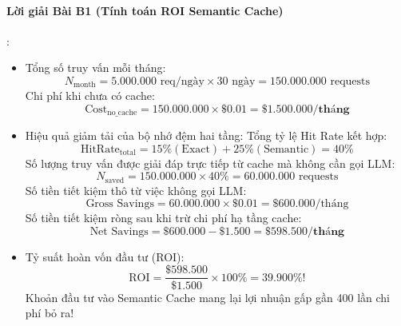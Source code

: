 \paragraph{Lời giải Bài B1 (Tính toán ROI Semantic Cache)}:
\begin{itemize}
  \item[a)] Tổng số truy vấn mỗi tháng:
  \begin{equation*}
  N_{\text{month}} = 5.000.000 \text{ req/ngày} \times 30 \text{ ngày} = 150.000.000 \text{ requests}
  \end{equation*}
  Chi phí khi chưa có cache:
  \begin{equation*}
  \text{Cost}_{\text{no\_cache}} = 150.000.000 \times \$0.01 = \mathbf{\$1.500.000\text{/tháng}}
  \end{equation*}

  \item[b)] Hiệu quả giảm tải của bộ nhớ đệm hai tầng:
  Tổng tỷ lệ Hit Rate kết hợp:
  \begin{equation*}
  \text{HitRate}_{\text{total}} = 15\% (\text{Exact}) + 25\% (\text{Semantic}) = 40\%
  \end{equation*}
  Số lượng truy vấn được giải đáp trực tiếp từ cache mà không cần gọi LLM:
  \begin{equation*}
  N_{\text{saved}} = 150.000.000 \times 40\% = 60.000.000 \text{ requests}
  \end{equation*}
  Số tiền tiết kiệm thô từ việc không gọi LLM:
  \begin{equation*}
  \text{Gross Savings} = 60.000.000 \times \$0.01 = \$600.000\text{/tháng}
  \end{equation*}
  Số tiền tiết kiệm ròng sau khi trừ chi phí hạ tầng cache:
  \begin{equation*}
  \text{Net Savings} = \$600.000 - \$1.500 = \mathbf{\$598.500\text{/tháng}}
  \end{equation*}

  \item[c)] Tỷ suất hoàn vốn đầu tư (ROI):
  \begin{equation*}
  \text{ROI} = \frac{\$598.500}{\$1.500} \times 100\% = \mathbf{39.900\%}!
  \end{equation*}
  Khoản đầu tư vào Semantic Cache mang lại lợi nhuận gấp gần 400 lần chi phí bỏ ra!
\end{itemize}

